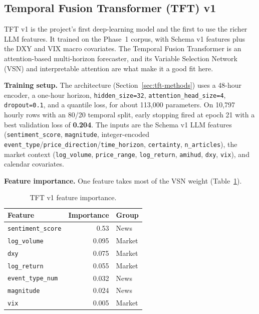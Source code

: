 \subsection{Temporal Fusion Transformer (TFT) v1}\label{sec:tft-v1}

TFT v1 is the project's first deep-learning model and the first to use the richer LLM features. It trained on the Phase~1 corpus, with Schema v1 features plus the DXY and VIX macro covariates. The Temporal Fusion Transformer \citep{lim2021} is an attention-based multi-horizon forecaster, and its Variable Selection Network (VSN) and interpretable attention are what make it a good fit here.

\textbf{Training setup.} The architecture (Section~\ref{sec:tft-methods}) uses a 48-hour encoder, a one-hour horizon, \texttt{hidden\_size=32}, \texttt{attention\_head\_size=4}, \texttt{dropout=0.1}, and a quantile loss, for about 113{,}000 parameters. On 10{,}797 hourly rows with an 80/20 temporal split, early stopping fired at epoch 21 with a best validation loss of \textbf{0.204}. The inputs are the Schema v1 LLM features (\texttt{sentiment\_score}, \texttt{magnitude}, integer-encoded \texttt{event\_type}/\texttt{price\_direction}/\texttt{time\_horizon}, \texttt{certainty}, \texttt{n\_articles}), the market context (\texttt{log\_volume}, \texttt{price\_range}, \texttt{log\_return}, \texttt{amihud}, \texttt{dxy}, \texttt{vix}), and calendar covariates.

\textbf{Feature importance.} One feature takes most of the VSN weight (Table~\ref{tab:tftv1-importance}).

\begin{table}[h]
  \centering
  \caption{TFT v1 feature importance.}
  \label{tab:tftv1-importance}
  \begin{tabular}{@{}lrl@{}}
    \toprule
    Feature & Importance & Group \\
    \midrule
    \texttt{sentiment\_score} & 0.53 & News \\
    \texttt{log\_volume} & 0.095 & Market \\
    \texttt{dxy} & 0.075 & Market \\
    \texttt{log\_return} & 0.055 & Market \\
    \texttt{event\_type\_num} & 0.032 & News \\
    \texttt{magnitude} & 0.024 & News \\
    \texttt{vix} & 0.005 & Market \\
    \bottomrule
  \end{tabular}
\end{table}

